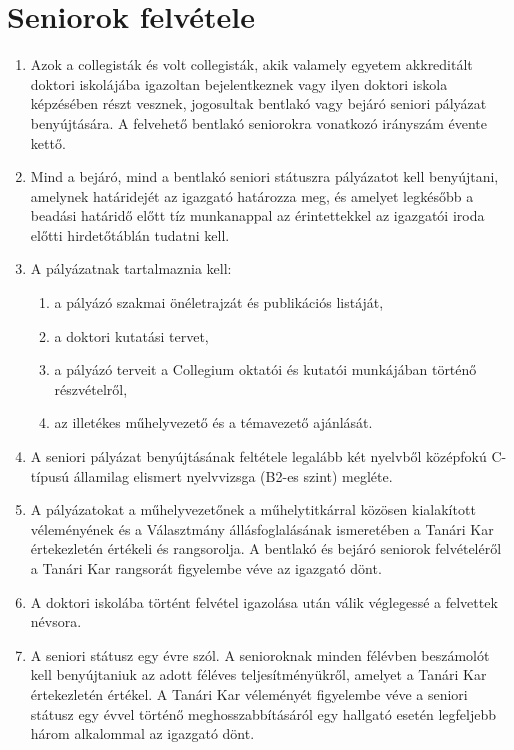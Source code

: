 \documentclass{../styles/rulebook}
\begin{document}
\section{Seniorok felvétele}

\begin{enumerate}
	\item	Azok a collegisták és volt collegisták, akik valamely egyetem akkreditált doktori iskolájába igazoltan bejelentkeznek vagy ilyen doktori iskola képzésében részt vesznek, jogosultak bentlakó vagy bejáró seniori pályázat benyújtására. A felvehető bentlakó seniorokra vonatkozó irányszám évente kettő.
	\item	Mind a bejáró, mind a bentlakó seniori státuszra pályázatot kell benyújtani, amelynek határidejét az igazgató határozza meg, és amelyet legkésőbb a beadási határidő előtt tíz munkanappal az érintettekkel az igazgatói iroda előtti hirdetőtáblán tudatni kell.
	\item	A pályázatnak tartalmaznia kell:
	\begin{enumerate}
		\item	a pályázó szakmai önéletrajzát és publikációs listáját,
		\item	a doktori kutatási tervet,
		\item	a pályázó terveit a Collegium oktatói és kutatói munkájában történő részvételről,
		\item	az illetékes műhelyvezető és a témavezető ajánlását.
	\end{enumerate}
	\item	A seniori pályázat benyújtásának feltétele legalább két nyelvből középfokú C-típusú államilag elismert nyelvvizsga (B2-es szint) megléte. %
	\item	A pályázatokat a műhelyvezetőnek a műhelytitkárral közösen kialakított véleményének és a Választmány állásfoglalásának ismeretében a Tanári Kar értekezletén értékeli és rangsorolja. A bentlakó és bejáró seniorok felvételéről a Tanári Kar rangsorát figyelembe véve az igazgató dönt.  %
	\item	A doktori iskolába történt felvétel igazolása után válik véglegessé a felvettek névsora.
	\item	A seniori státusz egy évre szól. A senioroknak minden félévben beszámolót kell benyújtaniuk az adott féléves teljesítményükről, amelyet a Tanári Kar értekezletén értékel. A Tanári Kar véleményét figyelembe véve a seniori státusz egy évvel történő meghosszabbításáról egy hallgató esetén legfeljebb három alkalommal az igazgató dönt.
\end{enumerate}
\end{document}
